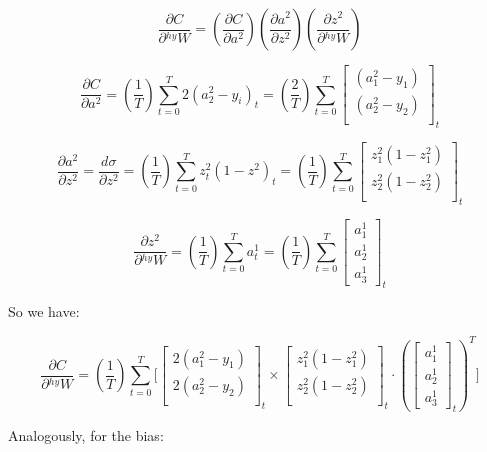 \documentclass[12pt]{article}
\begin{document}
\begin{equation}
    \dfrac{\partial C}{\partial {}^{hy}W} = \left( \dfrac{\partial C}{\partial a^{2}}\right) \left( \dfrac{\partial a^{2}}{\partial z^{2}}\right) \left(\dfrac{\partial z^{2}}{\partial {}^{hy}W} \right)
\end{equation}

\[
\dfrac{\partial C}{\partial a^{2}} =  (\dfrac{1}{T}) \sum_{t=0}^{T} 2(a_{2}^{2} - y_{i})_{t} = (\dfrac{2}{T}) \sum_{t=0}^{T} 
\begin{bmatrix}
(a_{1}^{2} - y_{1})\\
(a_{2}^{2} - y_{2})\\
\end{bmatrix}_{t}
\]

\[
\dfrac{\partial a^{2}}{\partial z^{2}} = \dfrac{d \sigma}{\partial z^{2}} = (\dfrac{1}{T}) \sum_{t=0}^{T} z^{2}_{t} ( 1 - z^{2} )_{t} = (\dfrac{1}{T}) \sum_{t=0}^{T} 
\begin{bmatrix}
z_{1}^{2}(1 - z_{1}^{2})\\
z_{2}^{2}(1 - z_{2}^{2})\\
\end{bmatrix}_{t}
\]

\[
\dfrac{\partial z^{2}}{\partial {}^{hy}W} = (\dfrac{1}{T}) \sum_{t=0}^{T} a^{1}_{t} = (\dfrac{1}{T}) \sum_{t=0}^{T} 
\begin{bmatrix}
a_{1}^{1}\\
a_{2}^{1}\\
a_{3}^{1}
\end{bmatrix}_{t}
\]

So we have:

\[
\dfrac{\partial C}{\partial {}^{hy}W} 
=
(\dfrac{1}{T}) \sum_{t=0}^{T} 
\Bigg[
\begin{bmatrix}
2(a_{1}^{2} - y_{1})\\
2(a_{2}^{2} - y_{2})\\
\end{bmatrix}_{t}
\times
\begin{bmatrix}
z_{1}^{2}(1 - z_{1}^{2})\\
z_{2}^{2}(1 - z_{2}^{2})\\
\end{bmatrix}_{t}
\cdot
\left(
\begin{bmatrix}
a_{1}^{1}\\
a_{2}^{1}\\
a_{3}^{1}
\end{bmatrix}_{t}
\right)^{T}
\Bigg]
\]

Analogously, for the bias:
\end{document}
